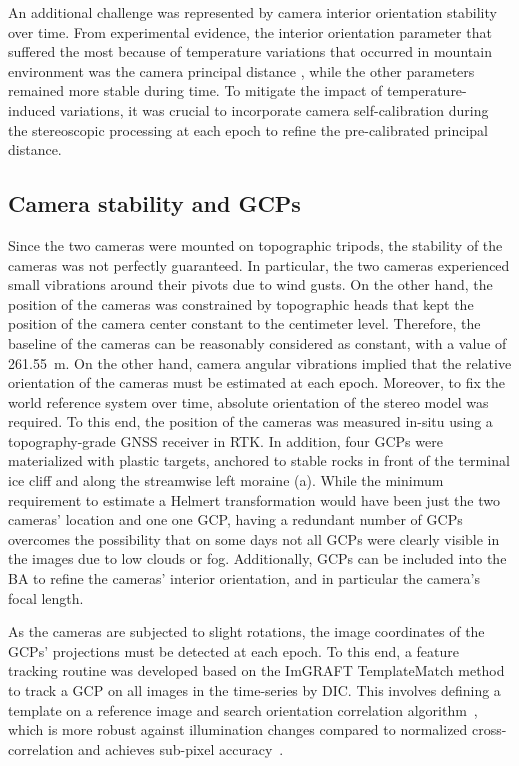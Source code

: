 An additional challenge was represented by camera interior orientation stability over
time.
From experimental evidence, the interior orientation parameter that suffered the most
because of temperature variations that occurred in mountain environment
was the camera principal distance \citep{Elias2020}, while the other parameters
remained more stable during time.
To mitigate the impact of temperature-induced variations, it was crucial to incorporate
camera self-calibration during the stereoscopic processing at each epoch to refine the
pre-calibrated principal distance.

\subsection{Camera stability and GCPs}\label{sec:4:stability}

Since the two cameras were mounted on topographic tripods, the stability of the cameras
was not perfectly guaranteed. In particular, the two cameras experienced small vibrations
around their pivots due to wind gusts.
On the other hand, the position of the cameras was constrained by topographic heads that
kept the position of the camera center constant to the centimeter level.
Therefore, the baseline of the cameras can be reasonably considered as constant, with a
value of \SI{261.55}{\meter}.
On the other hand, camera angular vibrations implied that the relative orientation of the
cameras must be estimated at each epoch.
Moreover, to fix the world reference system over time, absolute orientation of the
stereo model was required.
To this end, the position of the cameras was measured in-situ using a topography-grade
GNSS receiver in RTK.
In addition, four GCPs were materialized with plastic targets, anchored to stable rocks
in front of the terminal ice cliff and along the streamwise left
moraine (a).
While the minimum requirement to estimate a Helmert transformation would have been just
the two cameras' location and one one GCP, having a redundant number of GCPs overcomes
the possibility that on some days not all GCPs were clearly visible in the images due 
to low clouds or fog.
Additionally, GCPs can be included into the BA to refine the cameras' interior
orientation, and in particular the camera's focal length.

As the cameras are subjected to slight rotations, the image coordinates of the GCPs'
projections must be detected at each epoch.
To this end, a feature tracking routine was developed based on the ImGRAFT TemplateMatch
method~\citep{Messerli2015} to track a GCP on all images in the time-series by DIC. 
This involves defining a template on a reference image and search 
orientation correlation algorithm~\citep{fitch2002_OC}, which is more robust against illumination changes compared to normalized cross-correlation and achieves sub-pixel accuracy~\citep{Dematteis2021,Heid2012_evaluation_xcorr}.

